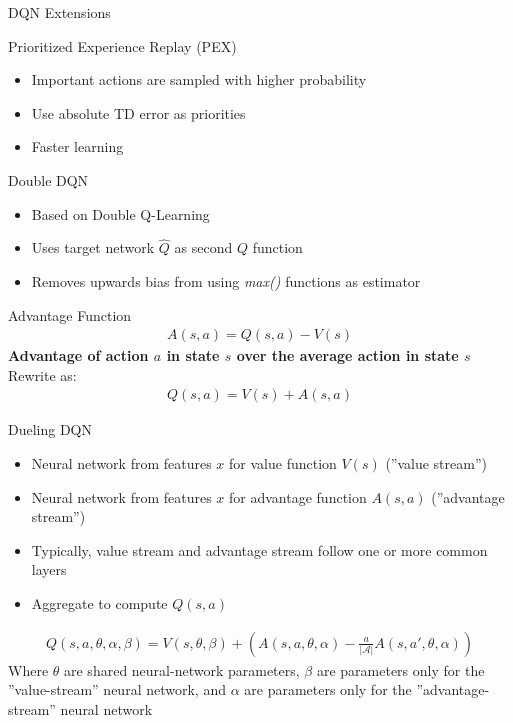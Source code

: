\documentclass[ignorenonframetext,xcolor=x11names]{beamer}
\begin{document}
\begin{frame}{DQN Extensions}
\begin{block}{Prioritized Experience Replay (PEX)}
\begin{itemize}
   \item Important actions are sampled with higher probability
   \item Use absolute TD error as priorities
   \item Faster learning
\end{itemize}
\end{block}

\begin{block}{Double DQN}
\begin{itemize}
   \item Based on Double Q-Learning
   \item Uses target network $\hat{Q}$ as second $Q$ function
   \item Removes upwards bias from using \emph{max()} functions as estimator
\end{itemize}
\end{block}
\end{frame}

\begin{frame}{Advantage Function}
\begin{align*}
A(s, a) = Q(s, a) - V(s)
\end{align*}
\textbf{Advantage of action $a$ in state $s$ over the average action in state $s$} \\

Rewrite as:
\begin{align*}
Q(s, a) = V(s) + A(s, a)
\end{align*}
\end{frame}

\begin{frame}{Dueling DQN}
\begin{itemize}
   \item Neural network from features $x$ for value function $V(s)$ (''value stream'')
   \item Neural network from features $x$ for advantage function $A(s, a)$ (''advantage stream'')
   \item Typically, value stream and advantage stream follow one or more common layers
   \item Aggregate to compute $Q(s, a)$
\end{itemize}
\begin{align*}
Q(s, a, \theta, \alpha, \beta) = V(s, \theta, \beta) + \left( A(s, a, \theta, \alpha) - \frac{a}{|\mathcal{A}|} A(s, a', \theta, \alpha) \right)
\end{align*}
Where $\theta$ are shared neural-network parameters, $\beta$ are parameters only for the ''value-stream'' neural network, and $\alpha$ are parameters only for the ''advantage-stream'' neural network
\end{frame}
\end{document}
